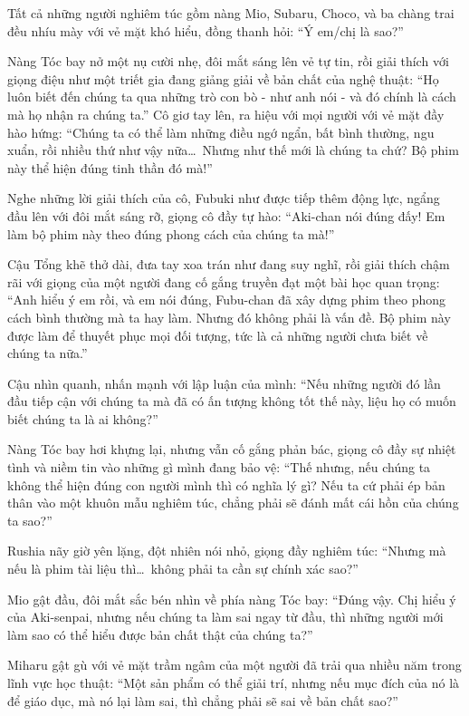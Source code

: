 \documentclass[../main.tex]{subfiles}
\begin{document}
Tất cả những người nghiêm túc gồm nàng Mio, Subaru, Choco, và ba chàng trai đều nhíu mày với vẻ mặt khó hiểu, đồng thanh hỏi: ``Ý em/chị là sao?''

Nàng Tóc bay nở một nụ cười nhẹ, đôi mắt sáng lên vẻ tự tin, rồi giải thích với giọng điệu như một triết gia đang giảng giải về bản chất của nghệ thuật: ``Họ luôn biết đến chúng ta qua những trò con bò - như anh nói - và đó chính là cách mà họ nhận ra chúng ta.'' Cô giơ tay lên, ra hiệu với mọi người với vẻ mặt đầy hào hứng: ``Chúng ta có thể làm những điều ngớ ngẩn, bất bình thường, ngu xuẩn, rồi nhiều thứ như vậy nữa\dots\ Nhưng như thế mới là chúng ta chứ? Bộ phim này thể hiện đúng tinh thần đó mà!''

Nghe những lời giải thích của cô, Fubuki như được tiếp thêm động lực, ngẩng đầu lên với đôi mắt sáng rỡ, giọng cô đầy tự hào: ``Aki-chan nói đúng đấy! Em làm bộ phim này theo đúng phong cách của chúng ta mà!''

Cậu Tổng khẽ thở dài, đưa tay xoa trán như đang suy nghĩ, rồi giải thích chậm rãi với giọng của một người đang cố gắng truyền đạt một bài học quan trọng: ``Anh hiểu ý em rồi, và em nói đúng, Fubu-chan đã xây dựng phim theo phong cách bình thường mà ta hay làm. Nhưng đó không phải là vấn đề. Bộ phim này được làm để thuyết phục mọi đối tượng, tức là cả những người chưa biết về chúng ta nữa.''

Cậu nhìn quanh, nhấn mạnh với lập luận của mình: ``Nếu những người đó lần đầu tiếp cận với chúng ta mà đã có ấn tượng không tốt thế này, liệu họ có muốn biết chúng ta là ai không?''

Nàng Tóc bay hơi khựng lại, nhưng vẫn cố gắng phản bác, giọng cô đầy sự nhiệt tình và niềm tin vào những gì mình đang bảo vệ: ``Thế nhưng, nếu chúng ta không thể hiện đúng con người mình thì có nghĩa lý gì? Nếu ta cứ phải ép bản thân vào một khuôn mẫu nghiêm túc, chẳng phải sẽ đánh mất cái hồn của chúng ta sao?''

Rushia nãy giờ yên lặng, đột nhiên nói nhỏ, giọng đầy nghiêm túc: ``Nhưng mà nếu là phim tài liệu thì\dots\ không phải ta cần sự chính xác sao?''

Mio gật đầu, đôi mắt sắc bén nhìn về phía nàng Tóc bay: ``Đúng vậy. Chị hiểu ý của Aki-senpai, nhưng nếu chúng ta làm sai ngay từ đầu, thì những người mới làm sao có thể hiểu được bản chất thật của chúng ta?''

Miharu gật gù với vẻ mặt trầm ngâm của một người đã trải qua nhiều năm trong lĩnh vực học thuật: ``Một sản phẩm có thể giải trí, nhưng nếu mục đích của nó là để giáo dục, mà nó lại làm sai, thì chẳng phải sẽ sai về bản chất sao?''
\end{document}
